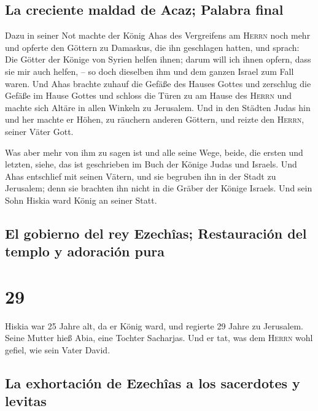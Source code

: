 \hypertarget{la-creciente-maldad-de-acaz-palabra-final}{%
\subsection{La creciente maldad de Acaz; Palabra
final}\label{la-creciente-maldad-de-acaz-palabra-final}}

 Dazu in seiner Not machte der König Ahas des Vergreifens
am \textsc{Herrn} noch mehr  und opferte den Göttern zu
Damaskus, die ihn geschlagen hatten, und sprach: Die Götter der Könige
von Syrien helfen ihnen; darum will ich ihnen opfern, dass sie mir auch
helfen, -- so doch dieselben ihm und dem ganzen Israel zum Fall waren.
 Und Ahas brachte zuhauf die Gefäße des Hauses Gottes und
zerschlug die Gefäße im Hause Gottes und schloss die Türen zu am Hause
des \textsc{Herrn} und machte sich Altäre in allen Winkeln zu Jerusalem.
 Und in den Städten Judas hin und her machte er Höhen, zu
räuchern anderen Göttern, und reizte den \textsc{Herrn}, seiner Väter
Gott.

 Was aber mehr von ihm zu sagen ist und alle seine Wege,
beide, die ersten und letzten, siehe, das ist geschrieben im Buch der
Könige Judas und Israels.  Und Ahas entschlief mit seinen
Vätern, und sie begruben ihn in der Stadt zu Jerusalem; denn sie
brachten ihn nicht in die Gräber der Könige Israels. Und sein Sohn
Hiskia ward König an seiner Statt.

\hypertarget{el-gobierno-del-rey-ezechuxeeas-restauraciuxf3n-del-templo-y-adoraciuxf3n-pura}{%
\subsection{El gobierno del rey Ezechîas; Restauración del templo y
adoración
pura}\label{el-gobierno-del-rey-ezechuxeeas-restauraciuxf3n-del-templo-y-adoraciuxf3n-pura}}

\hypertarget{section-28}{%
\section{29}\label{section-28}}

 Hiskia war 25 Jahre alt, da er König ward, und regierte
29 Jahre zu Jerusalem. Seine Mutter hieß Abia, eine Tochter Sacharjas.
 Und er tat, was dem \textsc{Herrn} wohl gefiel, wie sein
Vater David.

\hypertarget{la-exhortaciuxf3n-de-ezechuxeeas-a-los-sacerdotes-y-levitas}{%
\subsection{La exhortación de Ezechîas a los sacerdotes y
levitas}\label{la-exhortaciuxf3n-de-ezechuxeeas-a-los-sacerdotes-y-levitas}}

